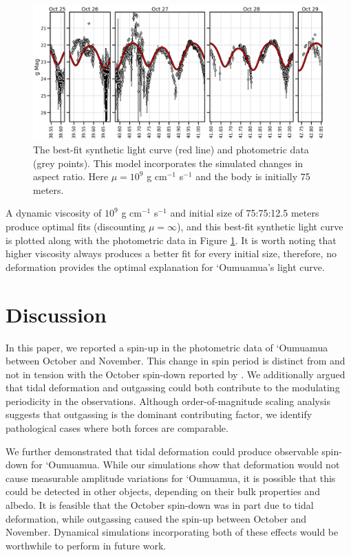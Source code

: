 \documentclass[twocolumn,doublespacing]{aastex631}
\begin{document}
\begin{figure}
\centering
\includegraphics[width=\linewidth,angle=0]{optimal_sims_best_fit_lightcurve_comp.pdf}
\caption{The best-fit synthetic light curve (red line) and photometric data (grey points). This model incorporates the simulated changes in aspect ratio. Here $\mu=10^9$ g cm$^{-1}$ s$^{-1}$ and the body is initially 75 meters.}
\label{fig:optaxbestfitlightcurvesims}
\end{figure}

A dynamic viscosity of $10^9$ g cm$^{-1}$ s$^{-1}$ and initial size of 75:75:12.5 meters produce optimal fits (discounting $\mu=\infty$), and this best-fit synthetic light curve is plotted along with the photometric data in Figure \ref{fig:optaxbestfitlightcurvesims}. It is worth noting that higher viscosity always produces a better fit for every initial size, therefore, no deformation provides the optimal explanation for `Oumuamua's light curve. 
 
\section{Discussion}\label{sec:discussion}
 
In this paper, we reported a spin-up in the photometric data of `Oumuamua between October and November. This change in spin period is distinct from and not in tension with the October spin-down reported by \citet{flekkoy2019}. We additionally argued that tidal deformation and outgassing could both contribute to the modulating periodicity in the observations. Although order-of-magnitude scaling analysis suggests that outgassing is the dominant contributing factor, we identify pathological cases where both forces are comparable. 

We further demonstrated that tidal deformation could produce observable spin-down for `Oumuamua. While our simulations show that deformation would not cause measurable amplitude variations for `Oumuamua, it is possible that this could be detected in other objects, depending on their bulk properties and albedo. It is feasible that the October spin-down was in part due to tidal deformation, while outgassing caused the spin-up between October and November. Dynamical simulations incorporating both of these effects would be worthwhile to perform in future work.
\end{document}
